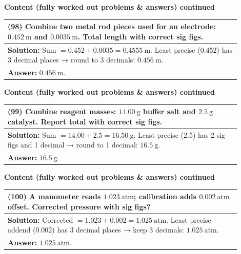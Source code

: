 \documentclass{article}
\begin{document}
\noindent
{\large \textbf{Content (fully worked out problems \& answers) continued}} \\[0.2em]
\begin{tabular}{|p{0.9\linewidth}|}
\hline
\vspace{0.2cm}
\textbf{(98)} Combine two metal rod pieces used for an electrode: $0.452~\text{m}$ and $0.0035~\text{m}$. Total length with correct sig figs. \\
\hline
\vspace{0.2cm}
\textbf{Solution:} Sum $=0.452+0.0035=0.4555~\text{m}$. Least precise (0.452) has 3 decimal places → round to 3 decimals: $0.456~\text{m}$. \\
\textbf{Answer:} $0.456~\text{m}$. \\
\hline
\end{tabular}
\newpage

\noindent
{\large \textbf{Content (fully worked out problems \& answers) continued}} \\[0.2em]
\begin{tabular}{|p{0.9\linewidth}|}
\hline
\vspace{0.2cm}
\textbf{(99)} Combine reagent masses: $14.00~\text{g}$ buffer salt and $2.5~\text{g}$ catalyst. Report total with correct sig figs. \\
\hline
\vspace{0.2cm}
\textbf{Solution:} Sum $=14.00+2.5=16.50~\text{g}$. Least precise (2.5) has 2 sig figs and 1 decimal → round to 1 decimal: $16.5~\text{g}$. \\
\textbf{Answer:} $16.5~\text{g}$. \\
\hline
\end{tabular}
\newpage

\noindent
{\large \textbf{Content (fully worked out problems \& answers) continued}} \\[0.2em]
\begin{tabular}{|p{0.9\linewidth}|}
\hline
\vspace{0.2cm}
\textbf{(100)} A manometer reads $1.023~\text{atm}$; calibration adds $0.002~\text{atm}$ offset. Corrected pressure with sig figs? \\
\hline
\vspace{0.2cm}
\textbf{Solution:} Corrected $=1.023+0.002=1.025~\text{atm}$. Least precise addend (0.002) has 3 decimal places → keep 3 decimals: $1.025~\text{atm}$. \\
\textbf{Answer:} $1.025~\text{atm}$. \\
\hline
\end{tabular}
\newpage
\end{document}
